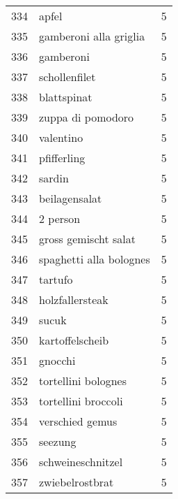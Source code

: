 \begin{tabular}{llr}
334  &                                              apfel &      5 \\
335  &                             gamberoni alla griglia &      5 \\
336  &                                          gamberoni &      5 \\
337  &                                      schollenfilet &      5 \\
338  &                                        blattspinat &      5 \\
339  &                                  zuppa di pomodoro &      5 \\
340  &                                          valentino &      5 \\
341  &                                        pfifferling &      5 \\
342  &                                             sardin &      5 \\
343  &                                      beilagensalat &      5 \\
344  &                                           2 person &      5 \\
345  &                               gross gemischt salat &      5 \\
346  &                            spaghetti alla bolognes &      5 \\
347  &                                            tartufo &      5 \\
348  &                                    holzfallersteak &      5 \\
349  &                                              sucuk &      5 \\
350  &                                    kartoffelscheib &      5 \\
351  &                                            gnocchi &      5 \\
352  &                                tortellini bolognes &      5 \\
353  &                                tortellini broccoli &      5 \\
354  &                                    verschied gemus &      5 \\
355  &                                            seezung &      5 \\
356  &                                  schweineschnitzel &      5 \\
357  &                                    zwiebelrostbrat &      5 \\

\end{tabular}
